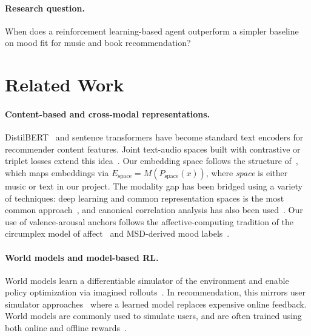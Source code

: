 \documentclass[11pt]{article}
\begin{document}
\paragraph{Research question.}
When does a reinforcement learning-based agent outperform a simpler
baseline on mood fit for music and book recommendation?

\section{Related Work}
\label{sec:related}

\paragraph{Content-based and cross-modal representations.}
DistilBERT~\cite{sanh2020distilbert} and sentence transformers have
become standard text encoders for recommender content features. Joint
text-audio spaces built with contrastive or triplet losses extend this
idea~\cite{schroff2015facenet,radford2021clip}. Our embedding space
follows the structure of~\cite{Won2021emotion}, which maps embeddings
via $E_{\text{space}} = M\!\left(P_{\text{space}}(x)\right)$, where
\emph{space} is either music or text in our project. The modality gap
has been bridged using a variety of techniques: deep learning and common
representation spaces is the most common approach~\cite{yao2015ranking},
and canonical correlation analysis has also been
used~\cite{zhen2019cross}. Our use of valence-arousal anchors follows
the affective-computing tradition of the circumplex model of
affect~\cite{russell1980circumplex} and MSD-derived mood
labels~\cite{bertinmahieux2011msd}.

\paragraph{World models and model-based RL.}
World models learn a differentiable simulator of the environment and
enable policy optimization via imagined rollouts~\cite{ha2018world,
hafner2020dreamer}. In recommendation, this mirrors user simulator
approaches~\cite{shi2019virtualtaobao,ie2019recsim} where a learned
model replaces expensive online feedback. World models are commonly used
to simulate users, and are often trained using both online and offline
rewards~\cite{yao2015ranking}.
\end{document}

